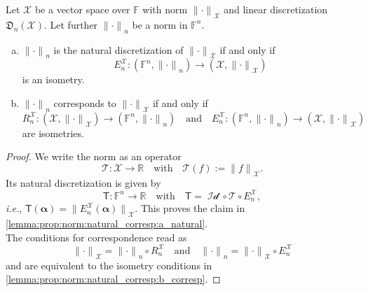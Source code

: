 \documentclass[a4paper]{paper}
\newcommand{\Discr}{\mathfrak{D}}
\newcommand{\Spc}[1]{\mathscr{#1}}
\newcommand{\Field}{\mathbb{F}}
\newcommand{\Real}{\mathbb{R}}
\newcommand{\Op}[1]{\mathcal{#1}}
\newcommand{\DiscOp}[1]{\mathsf{#1}}
\newcommand*{\EXT}[2]{\ensuremath{E_{#1}^{#2}}}
\newcommand*{\REST}[2]{\ensuremath{R_{#1}^{#2}}}
\newcommand*{\RnX}{\ensuremath{\REST{n}{\Spc{X}}}}
\newcommand*{\EnX}{\ensuremath{\EXT{n}{\Spc{X}}}}
\DeclareMathOperator{\Id}{Id}
\newcommand{\ie}{\textsl{i.e.}\xspace}
\newcommand{\valpha}{\boldsymbol{\alpha}}
\newcommand*{\NORM}[1]{\ensuremath{\lVert #1 \rVert}}
\begin{document}
\begin{lemma}
 \label{lemma:prop:norm:natural_corresp}
 Let $\Spc{X}$ be a vector space over $\Field$ with norm $\NORM{\cdot}_{\Spc{X}}$ and linear discretization 
 $\Discr_n(\Spc{X})$. Let further $\NORM{\cdot}_n$ be a norm in $\Field^n$.
 \begin{enumerate}[(a)]
  \item \label{lemma:prop:norm:natural_corresp:a_natural}
  $\NORM{\cdot}_n$ is the natural discretization of $\NORM{\cdot}_{\Spc{X}}$ if and only if
  \begin{equation*}
   \EnX \colon (\Field^n, \NORM{\cdot}_n) \to (\Spc{X}, \NORM{\cdot}_{\Spc{X}})
  \end{equation*}
  is an isometry.
  
  \item \label{lemma:prop:norm:natural_corresp:b_corresp}
  $\NORM{\cdot}_n$ corresponds to $\NORM{\cdot}_{\Spc{X}}$ if and only if
  \begin{equation*}
   \RnX \colon (\Spc{X}, \NORM{\cdot}_{\Spc{X}}) \to (\Field^n, \NORM{\cdot}_n)
   \quad \text{and} \quad
   \EnX \colon (\Field^n, \NORM{\cdot}_n) \to (\Spc{X}, \NORM{\cdot}_{\Spc{X}})
  \end{equation*}
  are isometries.
 \end{enumerate}
\end{lemma}

\begin{proof}
 We write the norm as an operator
 \begin{equation*}
  \Op{T} \colon \Spc{X} \to \Real \quad \text{with} \quad \Op{T}(f) := \NORM{f}_{\Spc{X}}.
 \end{equation*}
 Its natural discretization is given by
 \begin{equation*}
  \DiscOp{T} \colon \Field^n \to \Real \quad \text{with} \quad \DiscOp{T} = \Op{\Id} \circ \Op{T} \circ \EnX,
 \end{equation*}
 \ie, $\DiscOp{T}(\valpha) = \NORM{\EnX(\valpha)}_{\Spc{X}}$. This proves the claim in 
 \eqref{lemma:prop:norm:natural_corresp:a_natural}.\\
 The conditions for correspondence read as
 \begin{equation*}
  \NORM{\cdot}_{\Spc{X}} = \NORM{\cdot}_n \circ \RnX
  \quad \text{and} \quad
  \NORM{\cdot}_n = \NORM{\cdot}_{\Spc{X}} \circ \EnX
 \end{equation*}
 and are equivalent to the isometry conditions in \eqref{lemma:prop:norm:natural_corresp:b_corresp}.
\end{proof}
\end{document}
